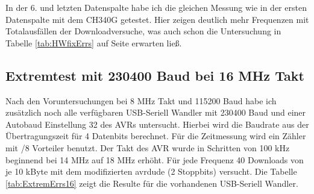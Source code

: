 In der 6. und letzten Datenspalte habe ich die gleichen Messung wie in der ersten Datenspalte
mit dem CH340G getestet. Hier zeigen deutlich mehr Frequenzen mit Totalausfällen der Downloadversuche,
was auch schon die Untersuchung in Tabelle \ref{tab:HWfixErrs} auf Seite \pageref{tab:HWfixErrs}
erwarten ließ.

\subsection{Extremtest mit 230400 Baud bei 16 MHz Takt}

Nach den Voruntersuchungen bei 8 MHz Takt und 115200 Baud habe ich zusätzlich noch alle verfügbaren
USB-Seriell Wandler mit 230400 Baud und einer Autobaud Einstellung 32 des AVRs untersucht.
Hierbei wird die Baudrate aus der Übertragungszeit für 4 Datenbits berechnet. Für die Zeitmessung wird
ein Zähler mit /8 Vorteiler benutzt. Der Takt des AVR wurde in Schritten von 100 kHz beginnend bei 14 MHz auf
18 MHz erhöht. Für jede Frequenz 40 Downloads von je 10 kByte mit dem modifizierten avrdude (2 Stoppbits) versucht.
Die Tabelle \ref{tab:ExtremErrs16} zeigt die Resulte für die vorhandenen USB-Seriell Wandler.


